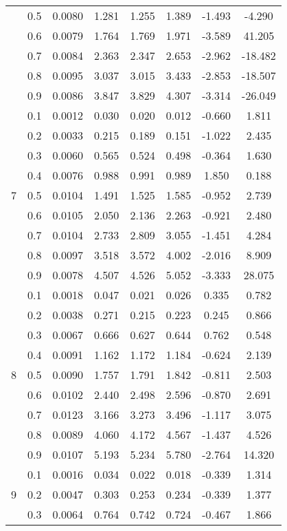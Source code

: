 \documentclass[11pt,a4paper]{report}
\begin{document}
\begin{longtable}{ | c | c || c | c | c | c | c | c | }
 & 0.5 & 0.0080 & 1.281 & 1.255 & 1.389 & -1.493 & -4.290 \\
 & 0.6 & 0.0079 & 1.764 & 1.769 & 1.971 & -3.589 & 41.205 \\
 & 0.7 & 0.0084 & 2.363 & 2.347 & 2.653 & -2.962 & -18.482 \\
 & 0.8 & 0.0095 & 3.037 & 3.015 & 3.433 & -2.853 & -18.507 \\
 & 0.9 & 0.0086 & 3.847 & 3.829 & 4.307 & -3.314 & -26.049 \\
 \hline
\multirow{9}{*}{7} & 0.1 & 0.0012 & 0.030 & 0.020 & 0.012 & -0.660 & 1.811 \\
 & 0.2 & 0.0033 & 0.215 & 0.189 & 0.151 & -1.022 & 2.435 \\
 & 0.3 & 0.0060 & 0.565 & 0.524 & 0.498 & -0.364 & 1.630 \\
 & 0.4 & 0.0076 & 0.988 & 0.991 & 0.989 & 1.850 & 0.188 \\
 & 0.5 & 0.0104 & 1.491 & 1.525 & 1.585 & -0.952 & 2.739 \\
 & 0.6 & 0.0105 & 2.050 & 2.136 & 2.263 & -0.921 & 2.480 \\
 & 0.7 & 0.0104 & 2.733 & 2.809 & 3.055 & -1.451 & 4.284 \\
 & 0.8 & 0.0097 & 3.518 & 3.572 & 4.002 & -2.016 & 8.909 \\
 & 0.9 & 0.0078 & 4.507 & 4.526 & 5.052 & -3.333 & 28.075 \\
 \hline
\multirow{9}{*}{8} & 0.1 & 0.0018 & 0.047 & 0.021 & 0.026 & 0.335 & 0.782 \\
 & 0.2 & 0.0038 & 0.271 & 0.215 & 0.223 & 0.245 & 0.866 \\
 & 0.3 & 0.0067 & 0.666 & 0.627 & 0.644 & 0.762 & 0.548 \\
 & 0.4 & 0.0091 & 1.162 & 1.172 & 1.184 & -0.624 & 2.139 \\
 & 0.5 & 0.0090 & 1.757 & 1.791 & 1.842 & -0.811 & 2.503 \\
 & 0.6 & 0.0102 & 2.440 & 2.498 & 2.596 & -0.870 & 2.691 \\
 & 0.7 & 0.0123 & 3.166 & 3.273 & 3.496 & -1.117 & 3.075 \\
 & 0.8 & 0.0089 & 4.060 & 4.172 & 4.567 & -1.437 & 4.526 \\
 & 0.9 & 0.0107 & 5.193 & 5.234 & 5.780 & -2.764 & 14.320 \\
 \hline
\multirow{9}{*}{9} & 0.1 & 0.0016 & 0.034 & 0.022 & 0.018 & -0.339 & 1.314 \\
 & 0.2 & 0.0047 & 0.303 & 0.253 & 0.234 & -0.339 & 1.377 \\
 & 0.3 & 0.0064 & 0.764 & 0.742 & 0.724 & -0.467 & 1.866 \\

\end{longtable}
\end{document}
